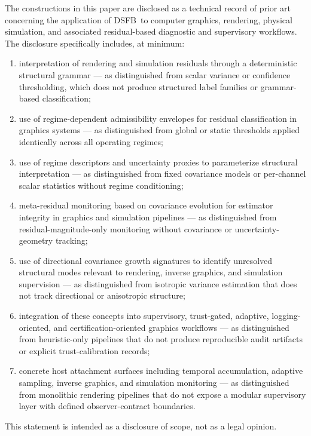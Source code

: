 \documentclass[11pt,letterpaper]{article}
\newcommand{\dsfb}{\textsc{DSFB}}
\theoremstyle{gcresult}
\theoremstyle{definition}
\begin{document}
The constructions in this paper are disclosed as a technical record of prior art concerning the application of \dsfb\ to computer graphics, rendering, physical simulation, and associated residual-based diagnostic and supervisory workflows. The disclosure specifically includes, at minimum:
\begin{enumerate}[leftmargin=2.2em]
    \item interpretation of rendering and simulation residuals through a deterministic structural grammar --- as distinguished from scalar variance or confidence thresholding, which does not produce structured label families or grammar-based classification;
    \item use of regime-dependent admissibility envelopes for residual classification in graphics systems --- as distinguished from global or static thresholds applied identically across all operating regimes;
    \item use of regime descriptors and uncertainty proxies to parameterize structural interpretation --- as distinguished from fixed covariance models or per-channel scalar statistics without regime conditioning;
    \item meta-residual monitoring based on covariance evolution for estimator integrity in graphics and simulation pipelines --- as distinguished from residual-magnitude-only monitoring without covariance or uncertainty-geometry tracking;
    \item use of directional covariance growth signatures to identify unresolved structural modes relevant to rendering, inverse graphics, and simulation supervision --- as distinguished from isotropic variance estimation that does not track directional or anisotropic structure;
    \item integration of these concepts into supervisory, trust-gated, adaptive, logging-oriented, and certification-oriented graphics workflows --- as distinguished from heuristic-only pipelines that do not produce reproducible audit artifacts or explicit trust-calibration records;
    \item concrete host attachment surfaces including temporal accumulation, adaptive sampling, inverse graphics, and simulation monitoring --- as distinguished from monolithic rendering pipelines that do not expose a modular supervisory layer with defined observer-contract boundaries.
\end{enumerate}
This statement is intended as a disclosure of scope, not as a legal opinion.
\end{document}
